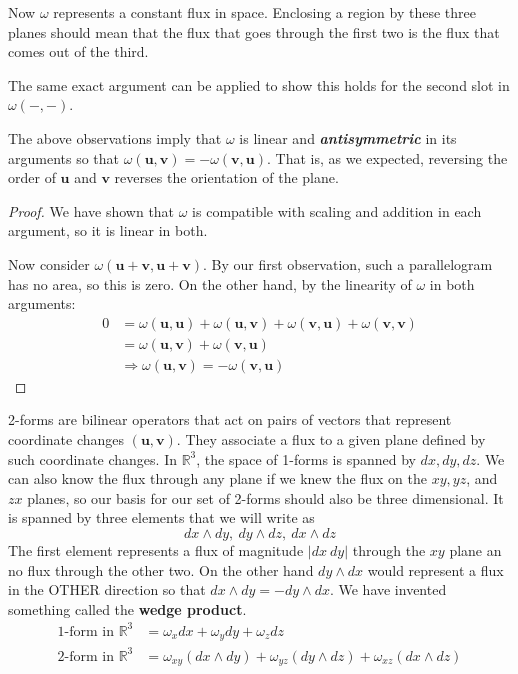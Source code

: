 \documentclass[../master.tex]{subfiles}
\begin{document}
	Now $\omega$ represents a constant flux in space. Enclosing a region by these three planes should mean that the flux that goes through the first two is the flux that comes out of the third.
	
	The same exact argument can be applied to show this holds for the second slot in $\omega(-,-)$.
	\begin{cor}
		The above observations imply that $\omega$ is linear and \emph{\textbf{antisymmetric}} in its arguments so that $\omega(\mathbf u, \mathbf v) = -\omega(\mathbf v, \mathbf u)$. That is, as we expected, reversing the order of $\mathbf u$ and $\mathbf v$ reverses the orientation of the plane.
	\end{cor}
	\begin{proof}
		We have shown that $\omega$ is compatible with scaling and addition in each argument, so it is linear in both.
		
		Now consider $\omega(\mathbf u + \mathbf v, \mathbf u + \mathbf v)$. By our first observation, such a parallelogram has no area, so this is zero. On the other hand, by the linearity of $\omega$ in both arguments:
		\begin{align*}
			0 &= \omega(\mathbf u, \mathbf u) + \omega(\mathbf u, \mathbf v) + \omega(\mathbf v, \mathbf u) + \omega( \mathbf v , \mathbf v) 
			\\
			&= \omega(\mathbf u, \mathbf v) + \omega( \mathbf v, \mathbf u) \\
			&\Rightarrow \omega(\mathbf u, \mathbf v) = - \omega(\mathbf v, \mathbf u)
		\end{align*}
	\end{proof}
	
	2-forms are bilinear operators that act on pairs of vectors that represent coordinate changes $(\mathbf u, \mathbf v)$. They associate a flux to a given plane defined by such coordinate changes. 
	In $\mathbb{R}^3$, the space of 1-forms is spanned by $dx, dy, dz$. We can also know the flux through any plane if we knew the flux on the $xy, yz$, and $zx$ planes, so our basis for our set of 2-forms should also be three dimensional. It is spanned by three elements that we will write as
	\begin{equation*}
		dx \wedge dy, ~ dy \wedge dz, ~ dx \wedge dz
	\end{equation*}
	The first element represents a flux of magnitude $|dx ~ dy|$ through the $xy$ plane an no flux through the other two. On the other hand $dy \wedge dx$ would represent a flux in the OTHER direction so that $dx \wedge dy = - dy \wedge dx$. We have invented something called the \textbf{wedge product}.
	\begin{align*}
		\text{1-form in $\mathbb R^3$} &= \omega_x dx + \omega_y dy + \omega_z dz\\
		\text{2-form in $\mathbb R^3$} 
		&=
		\omega_{xy} (dx \wedge dy) + \omega_{yz} (dy \wedge dz) + \omega_{xz} (dx \wedge dz) 
	\end{align*}
	
\end{document}
